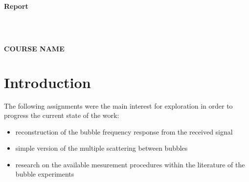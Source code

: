 \documentclass[11pt]{article}
\begin{document}
%  

\thispagestyle{empty}

\begin{center}
{\large{}}   


\vspace*{4cm}
{\Large\textbf{Report \\ }}   


\vspace*{7cm}
 {\Large{}} \\\vspace*{0.1cm}

\vspace*{2.3cm}
{\large{}\\\vspace*{0.1cm}
\LARGE\textbf{COURSE NAME}}\\
\vspace*{0.2cm}
{\large{}}   
\end{center}

\newpage

\tableofcontents

\section{Introduction}

The following assignments were the main interest for exploration in order to progress the current state of the work:

\begin{itemize}
    \item reconstruction of the bubble frequency response from the received signal
    \item simple version of the multiple scattering between bubbles
    \item research on the available mesurement procedures within the literature of the bubble experiments
\end{itemize}
\end{document}
